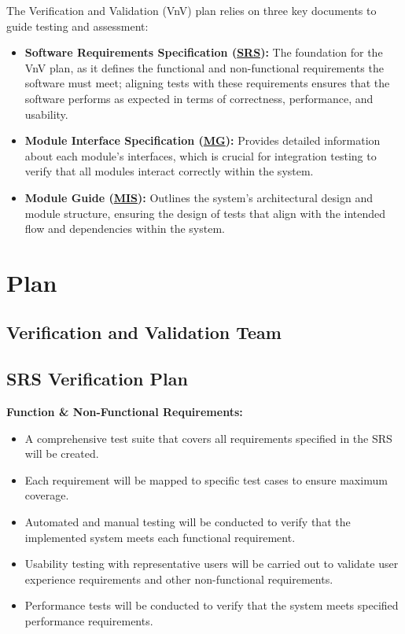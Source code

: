 \documentclass[12pt, titlepage]{article}
\newcommand{\SRS}{\href{https://github.com/ssm-lab/capstone--source-code-optimizer/blob/main/docs/SRS/SRS.pdf}{SRS}}
\newcommand{\MG}{\href{https://github.com/ssm-lab/capstone--source-code-optimizer/blob/main/docs/Design/SoftArchitecture/MG.pdf}{MG}}
\newcommand{\MIS}{\href{https://github.com/ssm-lab/capstone--source-code-optimizer/blob/main/docs/Design/SoftDetailedDes/MIS.pdf}{MIS}}
\begin{document}
The Verification and Validation (VnV) plan relies on three key documents to guide testing and assessment: 
\begin{itemize}
  \item[] \textbf{Software Requirements Specification (\SRS)\cite{SRS}:} The foundation for the VnV plan, as it defines the functional and non-functional requirements the software must meet; aligning tests with these requirements ensures that the software performs as expected in terms of correctness, performance, and usability.
  
  \item[] \textbf{Module Interface Specification (\MG)\cite{MGDoc}:} Provides detailed information about each module's interfaces, which is crucial for integration testing to verify that all modules interact correctly within the system.
  
  \item[] \textbf{Module Guide (\MIS)\cite{MISDoc}:} Outlines the system's architectural design and module structure, ensuring the design of tests that align with the intended flow and dependencies within the system.
\end{itemize}

\section{Plan}


\subsection{Verification and Validation Team}


\subsection{SRS Verification Plan}

\textbf{Function \& Non-Functional Requirements:}
\begin{itemize}
    \item A comprehensive test suite that covers all requirements specified in the SRS will be created.
    \item Each requirement will be mapped to specific test cases to ensure maximum coverage.
    \item Automated and manual testing will be conducted to verify that the implemented system meets each functional requirement.
    \item Usability testing with representative users will be carried out to validate user experience requirements and other non-functional requirements.
    \item Performance tests will be conducted to verify that the system meets specified performance requirements.
\end{itemize}
\end{document}
